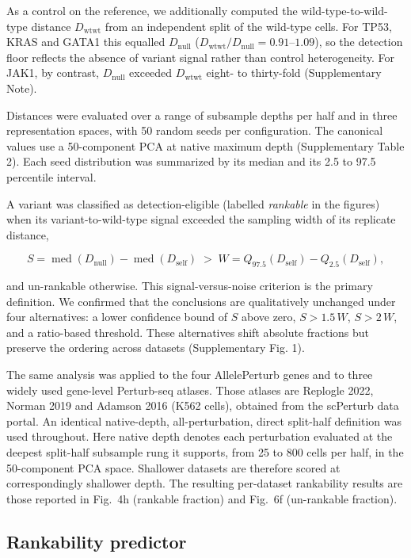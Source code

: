 \documentclass[11pt,letterpaper]{article}
\begin{document}
As a control on the reference, we additionally computed the wild-type-to-wild-type distance $D_{\mathrm{wtwt}}$ from an independent split of the wild-type cells. For TP53, KRAS and GATA1 this equalled $D_{\mathrm{null}}$ ($D_{\mathrm{wtwt}}/D_{\mathrm{null}} = 0.91$--$1.09$), so the detection floor reflects the absence of variant signal rather than control heterogeneity. For JAK1, by contrast, $D_{\mathrm{null}}$ exceeded $D_{\mathrm{wtwt}}$ eight- to thirty-fold (Supplementary Note).

Distances were evaluated over a range of subsample depths per half and in three representation spaces, with 50 random seeds per configuration. The canonical values use a 50-component PCA at native maximum depth (Supplementary Table 2). Each seed distribution was summarized by its median and its 2.5 to 97.5 percentile interval.

A variant was classified as detection-eligible (labelled \textit{rankable} in the figures) when its variant-to-wild-type signal exceeded the sampling width of its replicate distance,

\[
S = \operatorname{med}(D_{\mathrm{null}}) - \operatorname{med}(D_{\mathrm{self}}) \;>\; W = Q_{97.5}(D_{\mathrm{self}}) - Q_{2.5}(D_{\mathrm{self}}),
\]

and un-rankable otherwise. This signal-versus-noise criterion is the primary definition. We confirmed that the conclusions are qualitatively unchanged under four alternatives: a lower confidence bound of $S$ above zero, $S > 1.5\,W$, $S > 2\,W$, and a ratio-based threshold. These alternatives shift absolute fractions but preserve the ordering across datasets (Supplementary Fig. 1).

The same analysis was applied to the four AllelePerturb genes and to three widely used gene-level Perturb-seq atlases. Those atlases are Replogle 2022\cite{Replogle2022}, Norman 2019\cite{Norman2019} and Adamson 2016\cite{Adamson2016} (K562 cells), obtained from the scPerturb data portal\cite{scPerturb}. An identical native-depth, all-perturbation, direct split-half definition was used throughout. Here native depth denotes each perturbation evaluated at the deepest split-half subsample rung it supports, from 25 to 800 cells per half, in the 50-component PCA space. Shallower datasets are therefore scored at correspondingly shallower depth. The resulting per-dataset rankability results are those reported in Fig.~4h (rankable fraction) and Fig.~6f (un-rankable fraction).

\subsection*{Rankability predictor}
\end{document}
